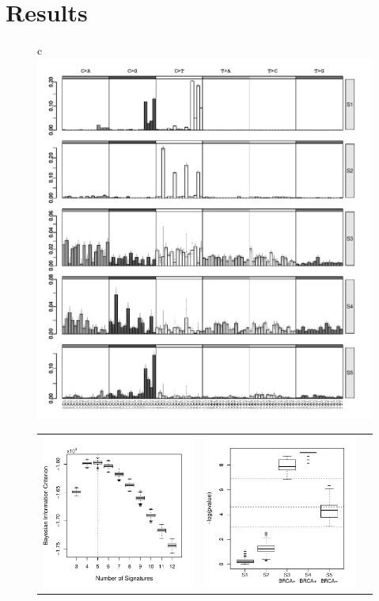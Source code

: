 \documentclass{bioinfo}
\begin{document}
\section{Results}
\begin{figure}[t!]
 \centering
  \begin{tabular}{c}
 \includegraphics[width=13cm]{figs/Signatures_5_com_Opp_bw}
    \\
    \begin{tabular}{ccc}
 \includegraphics[width=5.5cm]{figs/BICs_21bc_with_Opportunity_5_3to12}
     &
 \includegraphics[width=5.5cm]{figs/Diffexp_boxplot_21bc_com_Opp_bw3}

\end{tabular}
\end{tabular}
\end{figure}
\end{document}
